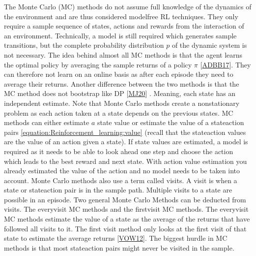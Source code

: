 \documentclass[letterpaper,10pt,english]{jupyterBook}
\begin{document}
\sphinxAtStartPar
The Monte Carlo (MC) methods do not assume full knowledge of the dynamics of the environment and are thus considered model\sphinxhyphen{}free RL techniques. They only require a sample sequence of states, actions and rewards from the interaction of an environment. Technically, a model is still required which generates sample transitions, but the complete probability distribution \(p\) of the dynamic system is not necessary. The idea behind almost all MC methods is that the agent learns the optimal policy by averaging the sample returns of a policy \(\pi\) {[}\hyperlink{cite.Discussion:id63}{ADBB17}{]}. They can therefore not learn on an online basis as after each episode they need to average their returns. Another difference between the two methods is that the MC method does not bootstrap like DP {[}\hyperlink{cite.Discussion:id52}{MJ20}{]} . Meaning, each state has an independent estimate. Note that Monte Carlo methods create a nonstationary problem as each action taken at a state depends on the previous states. MC methods can either estimate \(a\) state value  or estimate the value of a state\sphinxhyphen{}action pairs \eqref{equation:Reinforcement_learning:value} (recall that the state\sphinxhyphen{}action values are the value of an action given a state). If state values are estimated, a model is required as it needs to be able to look ahead one step and choose the action which leads to the best reward and next state. With action value estimation you already estimated the value of the action and no model needs to be taken into account.  Monte Carlo methods also use a term called visits. A visit is when a state or state\sphinxhyphen{}action pair is in the sample path. Multiple visits to a state are possible in an episode. Two general Monte Carlo Methods can be deducted from visits. The every\sphinxhyphen{}visit MC methods and the first\sphinxhyphen{}visit MC methods. The every\sphinxhyphen{}visit MC methods estimate the value of a state as the average of the returns that have followed all visits to it. The first visit method only looks at the first visit of that state to estimate the average returns {[}\hyperlink{cite.Discussion:id42}{VOW12}{]}. The biggest hurdle in MC methods is that most state\sphinxhyphen{}action pairs might never be visited in the sample.
\end{document}
